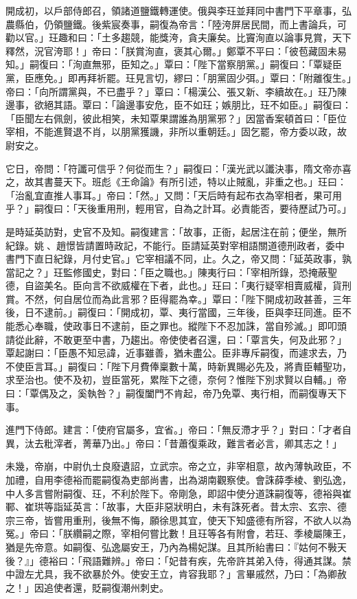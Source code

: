 \begin{pinyinscope}
 開成初，以戶部侍郎召，領諸道鹽鐵轉運使。俄與李玨並拜同中書門下平章事，弘農縣伯，仍領鹽鐵。後紫宸奏事，嗣復為帝言：「陸洿屏居民間，而上書論兵，可勸以官。」玨趣和曰：「土多趨競，能獎洿，貪夫廉矣。比竇洵直以論事見賞，天下釋然，況官洿耶！」帝曰：「朕賞洵直，褒其心爾。」鄭覃不平曰：「彼苞藏固未易知。」嗣復曰：「洵直無邪，臣知之。」覃曰：「陛下當察朋黨。」嗣復曰：「覃疑臣黨，臣應免。」即再拜祈罷。玨見言切，繆曰：「朋黨固少弭。」覃曰：「附離復生。」帝曰：「向所謂黨與，不已盡乎？」覃曰：「楊漢公、張又新、李續故在。」玨乃陳邊事，欲絕其語。覃曰：「論邊事安危，臣不如玨；嫉朋比，玨不如臣。」嗣復曰：「臣聞左右佩劍，彼此相笑，未知覃果謂誰為朋黨邪？」因當香案頓首曰：「臣位宰相，不能進賢退不肖，以朋黨獲譏，非所以重朝廷。」固乞罷，帝方委以政，故尉安之。



 它日，帝問：「符讖可信乎？何從而生？」嗣復曰：「漢光武以讖決事，隋文帝亦喜之，故其書蔓天下。班彪《王命論》有所引述，特以止賊亂，非重之也。」玨曰：「治亂宜直推人事耳。」帝曰：「然。」又問：「天后時有起布衣為宰相者，果可用乎？」嗣復曰：「天後重用刑，輕用官，自為之計耳。必責能否，要待歷試乃可。」



 是時延英訪對，史官不及知。嗣復建言：「故事，正衙，起居注在前；便坐，無所紀錄。姚、趙憬皆請置時政記，不能行。臣請延英對宰相語關道德刑政者，委中書門下直日紀錄，月付史官。」它宰相議不同，止。久之，帝又問：「延英政事，孰當記之？」玨監修國史，對曰：「臣之職也。」陳夷行曰：「宰相所錄，恐掩蔽聖德，自盜美名。臣向言不欲威權在下者，此也。」玨曰：「夷行疑宰相賣威權，貨刑賞。不然，何自居位而為此言邪？臣得罷為幸。」覃曰：「陛下開成初政甚善，三年後，日不逮前。」嗣復曰：「開成初，覃、夷行當國，三年後，臣與李玨同進。臣不能悉心奉職，使政事日不逮前，臣之罪也。縱陛下不忍加誅，當自殄滅。」即叩頭請從此辭，不敢更至中書，乃趨出。帝使使者召還，曰：「覃言失，何及此邪？」覃起謝曰：「臣愚不知忌諱，近事雖善，猶未盡公。臣非專斥嗣復，而遽求去，乃不使臣言耳。」嗣復曰：「陛下月費俸稟數十萬，時新異賜必先及，將責臣輔聖功，求至治也。使不及初，豈臣當死，累陛下之德，奈何？惟陛下別求賢以自輔。」帝曰：「覃偶及之，奚執咎？」嗣復闔門不肯起，帝乃免覃、夷行相，而嗣復專天下事。



 進門下侍郎。建言：「使府官屬多，宜省。」帝曰：「無反滯才乎？」對曰：「才者自異，汰去粃滓者，菁華乃出。」帝曰：「昔蕭復乘政，難言者必言，卿其志之！」



 未幾，帝崩，中尉仇士良廢遺詔，立武宗。帝之立，非宰相意，故內薄執政臣，不加禮，自用李德裕而罷嗣復為吏部尚書，出為湖南觀察使。會誅薛季棱、劉弘逸，中人多言嘗附嗣復、玨，不利於陛下。帝剛急，即詔中使分道誅嗣復等，德裕與崔鄆、崔珙等詣延英言：「故事，大臣非惡狀明白，未有誅死者。昔太宗、玄宗、德宗三帝，皆嘗用重刑，後無不悔，願徐思其宜，使天下知盛德有所容，不欲人以為冤。」帝曰：「朕纘嗣之際，宰相何嘗比數！且玨等各有附會，若玨、季棱屬陳王，猶是先帝意。如嗣復、弘逸屬安王，乃內為楊妃謀。且其所紿書曰：『姑何不斅天後？』」德裕曰：「飛語難辨。」帝曰：「妃昔有疾，先帝許其弟入侍，得通其謀。禁中證左尤具，我不欲暴於外。使安王立，肯容我耶？」言畢戚然，乃曰：「為卿赦之！」因追使者還，貶嗣復潮州刺史。




\end{pinyinscope}

